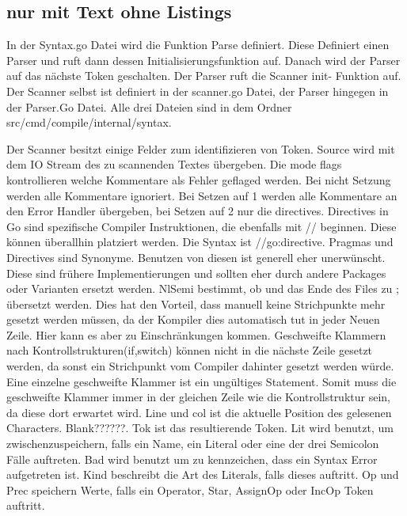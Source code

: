 \subsection{nur mit Text ohne Listings}
In der Syntax.go Datei wird die Funktion Parse definiert. Diese Definiert einen Parser und ruft dann dessen Initialisierungsfunktion auf. Danach wird der Parser auf das nächste Token geschalten. 
Der Parser ruft die Scanner init- Funktion auf. Der Scanner selbst ist definiert in der scanner.go Datei, der Parser hingegen in der Parser.Go Datei. Alle drei Dateien sind in dem Ordner src/cmd/compile/internal/syntax. 
\cite{donovan_go_2016}

Der Scanner besitzt einige Felder zum identifizieren von Token. 
Source wird mit dem IO Stream des zu scannenden Textes übergeben.
Die mode flags kontrollieren welche Kommentare als Fehler geflaged werden. 
Bei nicht Setzung werden alle Kommentare ignoriert. Bei Setzen auf 1 werden alle Kommentare an den Error Handler übergeben, bei Setzen auf 2 nur die directives. Directives in Go sind spezifische Compiler Instruktionen, die ebenfalls mit // beginnen. Diese können überallhin platziert werden. Die Syntax ist //go:directive. Pragmas und Directives sind Synonyme. Benutzen von diesen ist generell eher unerwünscht. Diese sind frühere Implementierungen und sollten eher durch andere Packages oder Varianten ersetzt werden.
NlSemi bestimmt, ob  und das Ende des Files zu ; übersetzt werden. Dies hat den Vorteil, dass manuell keine Strichpunkte mehr gesetzt werden müssen, da der Kompiler dies automatisch tut in jeder Neuen Zeile. Hier kann es aber zu Einschränkungen kommen. Geschweifte Klammern nach Kontrollstrukturen(if,switch) können nicht in die nächste Zeile gesetzt werden, da sonst ein Strichpunkt vom Compiler dahinter gesetzt werden würde. Eine einzelne geschweifte Klammer ist ein ungültiges Statement. Somit muss die geschweifte Klammer immer in der gleichen Zeile wie die Kontrollstruktur sein, da diese dort erwartet wird. 
Line und col ist die aktuelle Position des gelesenen Characters. Blank??????. Tok ist das resultierende Token. Lit wird benutzt, um zwischenzuspeichern, falls ein Name, ein Literal oder eine der drei Semicolon Fälle auftreten. Bad wird benutzt um zu kennzeichen, dass ein Syntax Error aufgetreten ist. Kind beschreibt die Art des Literals, falls dieses auftritt. Op und Prec speichern Werte, falls ein Operator, Star, AssignOp oder IncOp Token auftritt.

